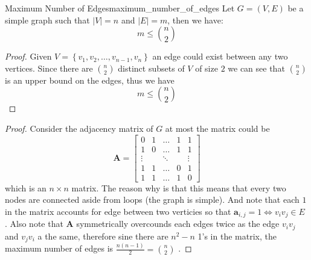 \begin{proposition}{Maximum Number of Edges}{maximum_number_of_edges}
Let $ G = \left( V, E \right)  $ be a simple graph such that $ \left| V \right|
= n$ and $ \left| E  \right| = m $, then we have:
\[
m \le \binom{n}{2}
\]
\end{proposition}
\begin{proof}
    Given $ V = \left\{ v_{1} , v_{2} , \dotsc  , v_{n - 1} , v_{n} \right\}  $
    an edge could exist between any two vertices. Since there are $ \binom{n}{2}
    $ distinct subsets of $ V $ of size $ 2 $ we can see that $ \binom{n}{2} $
    is an upper bound on the edges, thus we have
    \[
    m \le \binom{n}{2}
    \]
\end{proof}
\begin{proof}
    Consider the adjacency matrix of $ G $ at most the matrix could be 
    \[
        \boldsymbol{ A }  = 
        \begin{bmatrix}
                0 & 1 & \ldots & 1 & 1    \\
                1 & 0 & \ldots & 1 & 1    \\
            \vdots &    & \ddots &    & \vdots\\
                1 & 1 & \ldots & 0 & 1 \\
                1 & 1 & \ldots & 1 & 0 
        \end{bmatrix}
    \]
    which is an $ n \times n $ matrix. The reason why is that this means that
    every two nodes are connected aside from loops (the graph is simple). And
    note that each $ 1 $ in the matrix accounts for edge between two verticies
    so that $ \boldsymbol{ a } _{ i,j } = 1 \Leftrightarrow v _{ i } v _{ j }
    \in  E  $ . Also note that $ \boldsymbol{ A }   $ symmetrically overcounds
    each edges twice as the edge $ v _{ i } v _{ j }  $ and $ v _{ j } v _{ i }
    $ a the same, therefore sine there are $ n ^{ 2 } -  n $ 1's in the matrix,
    the maximum number of edges is $ \frac{n \left( n - 1 \right) }{2} =
    \binom{n}{2} $ .
\end{proof}

